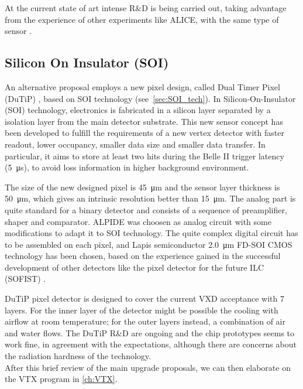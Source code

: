 At the current state of art intense R\&D is being carried out, taking advantage from the experience of other experiments like ALICE, with the same type of sensor \cite{Fantoni:2020iyr}.\\


\subsection{Silicon On Insulator (SOI)}

An alternative proposal employs a new pixel design, called Dual Timer Pixel (DuTiP) \cite{Ishikawa:2020gpo}, based on SOI technology (see~\autoref{sec:SOI_tech}). In Silicon-On-Insulator (SOI) technology, electronics is fabricated in a silicon layer separated by a  isolation layer from the main detector substrate.
This new sensor concept has been developed to fulfill the requirements of a new vertex detector with faster readout, lower occupancy, smaller data size and smaller data transfer. In particular, it aims to store at least two hits during the Belle II trigger latency (\SI{5}{\micro s}), to avoid loss information in higher background environment. 

The size of the new designed pixel is \SI{45}{\micro m} and the sensor layer thickness is \SI{50}{\micro m}, which gives an intrinsic resolution better than \SI{15}{\micro m}. The analog part is quite standard for a binary detector and consists of a sequence of preamplifier, shaper and comparator. ALPIDE \cite{AGLIERIRINELLA2017583} was choosen as analog circuit with some modifications to adapt it to SOI technology. 
The quite complex digital circuit has to be assembled on each pixel, and Lapis semiconductor \SI{2.0}{\micro m} FD-SOI CMOS technology has been chosen, based on the experience gained in the successful development of other detectors like the pixel detector for the future ILC (SOFIST) \cite{Murayama:2020ujz}.

DuTiP pixel detector is designed to cover the current VXD acceptance with 7 layers. For the inner layer of the detector might be possible the cooling with airflow at room temperature; for the outer layers instead, a combination of air and water flows. The DuTiP R\&D are ongoing and the chip prototypes seems to work fine, in agreement with the expectations, although there are concerns about the radiation hardness of the technology. \\

After this brief review of the main upgrade proposals, we can then elaborate on the VTX program in \autoref{ch:VTX}.


























